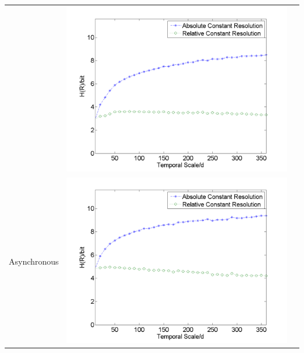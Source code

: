 \documentclass[review]{elsarticle}
\begin{document}
\begin{table}[H]
{\begin{tabular}{ccc}
&\begin{minipage}{.6\textwidth}\includegraphics[width=\linewidth]{resultgraph/e06810000.png}\end{minipage}
\\
Asynchronous
&\begin{minipage}{.6\textwidth}\includegraphics[width=\linewidth]{resultgraph/e02143000.png}\end{minipage}
 

\end{tabular}}
\end{table}
\end{document}
